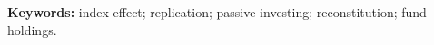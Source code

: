 \documentclass[12pt,a4paper]{article}
\begin{document}
\noindent\textbf{Keywords:} index effect; replication; passive investing; reconstitution; fund holdings.\par
\newpage



\clearpage


\clearpage

\FloatBarrier
\clearpage


\clearpage
\appendix
\setcounter{table}{0}
\renewcommand{\thetable}{A\arabic{table}}
\setcounter{figure}{0}
\renewcommand{\thefigure}{A\arabic{figure}}

\end{document}
